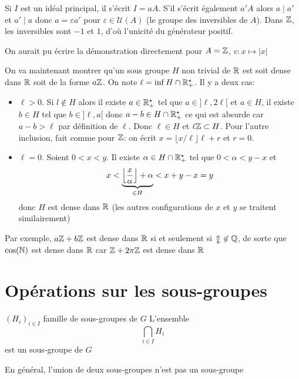 \begin{rem}
    Si $I$ est un idéal principal, il s'écrit $I=aA$. S'il s'écrit également $a'A$ alors $a\;|\;a'$ et $a'\;|\;a$ donc $a=\varepsilon a'$ pour $\varepsilon\in\mathcal U(A)$ (le groupe des inversibles de $A$). Dans $\mathbb Z$, les inversibles sont $-1$ et $1$, d'où l'unicité du générateur positif.
\end{rem}

\begin{rem}
    On aurait pu écrire la démonstration directement pour $A=\mathbb Z$, $v:x\mapsto |x|$
\end{rem}

On va maintenant montrer qu'un sous groupe $H$ non trivial de $\mathbb R$ est soit dense dans $\mathbb R$ soit de la forme $a\mathbb Z$. On note $\ell=\inf H\cap \mathbb R_+^\star$. Il y a deux cas: \begin{itemize}
    \item $\ell>0$. Si $l\not\in H$ alors il existe $a\in\mathbb R_+^\star$ tel que $a\in ]\ell, 2\ell[$ et $a\in H$, il existe $b\in H$ tel que $b\in ]\ell, a[$ donc $a-b\in H\cap \mathbb R_+^\star$ ce qui est absurde car $a-b>\ell$ par définition de $\ell$. Donc $\ell \in H$ et $\ell \mathbb Z\subset H$. Pour l'autre inclusion, fait comme pour $\mathbb Z$: on écrit $x=\lfloor x/\ell \rfloor \ell + r$ et $r=0$.
    \item $\ell=0$. Soient $0<x<y$. Il existe $\alpha\in H\cap \mathbb R_+^\star$ tel que $0<\alpha<y-x$ et \[
            x<\underbrace{\left\lfloor\frac x\alpha\right\rfloor+\alpha}_{\in H}<x+y-x=y
        \]
        donc $H$ est dense dans $\mathbb R$ (les autres configurations de $x$ et $y$ se traitent similairement)
\end{itemize}

Par exemple, $a\mathbb Z+b\mathbb Z$ est dense dans $\mathbb R$ si et seulement si $\frac ab\not\in \mathbb Q$, de sorte que $ \cos(\mathbb N) $ est dense dans $\mathbb R$ car $\mathbb Z+2\pi\mathbb Z$ est dense dans $\mathbb R$

\section{Opérations sur les sous-groupes}

\begin{prop}
    \Hyp $(H_i)_{i\in I}$ famille de sous-groupes de $G$
    \Conc L'ensemble \[
        \bigcap_{i\in I}H_i
    \]
    est un sous-groupe de $G$
\end{prop}

\begin{rem}
    En général, l'union de deux sous-groupes n'est pas un sous-groupe
\end{rem}

